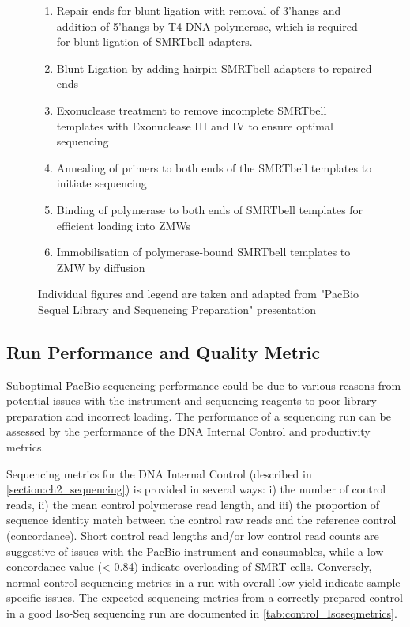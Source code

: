 \begin{figure}[!htp]
{\begin{enumerate}
			\item Repair ends for blunt ligation with removal of 3'hangs and addition of 5'hangs by T4 DNA polymerase, which is required for blunt ligation of SMRTbell adapters. 
			\item Blunt Ligation by adding hairpin SMRTbell adapters to repaired ends
			\item Exonuclease treatment to remove incomplete SMRTbell templates with Exonuclease III and IV to ensure optimal sequencing
			\item Annealing of primers to both ends of the SMRTbell templates to initiate sequencing 
			\item Binding of polymerase to both ends of SMRTbell templates for efficient loading into ZMWs
			\item Immobilisation of polymerase-bound SMRTbell templates to ZMW by diffusion
			\\
		\end{enumerate} 
		Individual figures and legend are taken and adapted from "PacBio Sequel Library and Sequencing Preparation" presentation
	}
	\label{fig:isoseq_labworkflow}
\end{figure}

\clearpage
\subsection{Run Performance and Quality Metric}
\label{sec: Isoseq_run_performance}
Suboptimal PacBio sequencing performance could be due to various reasons from potential issues with the instrument and sequencing reagents to poor library preparation and incorrect loading. The performance of a sequencing run can be assessed by the performance of the DNA Internal Control and productivity metrics. 

Sequencing metrics for the DNA Internal Control (described in \cref{section:ch2_sequencing}) is provided in several ways: i) the number of control reads, ii) the mean control polymerase read length, and iii) the proportion of sequence identity match between the control raw reads and the reference control (concordance). Short control read lengths and/or low control read counts are suggestive of issues with the PacBio instrument and consumables, while a low concordance value (< 0.84) indicate overloading of SMRT cells. Conversely, normal control sequencing metrics in a run with overall low yield indicate sample-specific issues. The expected sequencing metrics from a correctly prepared control in a good Iso-Seq sequencing run are documented in \cref{tab:control_Isoseqmetrics}. 

